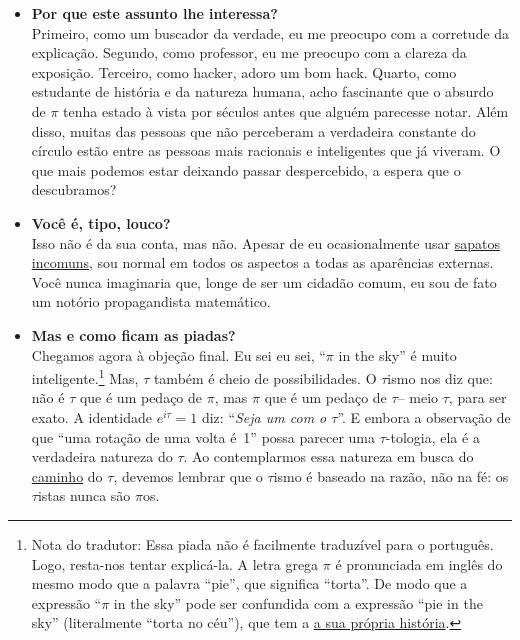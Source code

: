 \begin{itemize}
  \item \textbf{Por que este assunto lhe interessa?} \\ Primeiro, como um buscador da verdade, eu me preocupo com a corretude da explicação. Segundo, como professor, eu me preocupo com a clareza da exposição. Terceiro, como hacker, adoro um bom hack. Quarto, como estudante de história e da natureza humana, acho fascinante que o absurdo de $\pi$ tenha estado à vista por séculos antes que alguém parecesse notar. Além disso, muitas das pessoas que não perceberam a verdadeira constante do círculo estão entre as pessoas mais racionais e inteligentes que já viveram. O que mais podemos estar deixando passar despercebido, a espera que o descubramos?

  \item \textbf{Você é, tipo, louco?} \\ Isso não é da sua conta, mas não. Apesar de eu ocasionalmente usar \href{https://en.wikipedia.org/wiki/Vibram_FiveFingers}{sapatos incomuns}, sou normal em todos os aspectos a todas as aparências externas. Você nunca imaginaria que, longe de ser um cidadão comum, eu sou de fato um notório propagandista matemático.

  \item \textbf{Mas e como ficam as piadas?} \\ Chegamos agora à objeção final. Eu sei eu sei, ``$\pi$ in the sky'' é muito inteligente.\footnote{Nota do tradutor: Essa piada não é facilmente traduzível para o português. Logo, resta-nos tentar explicá-la. A letra grega $\pi$ é pronunciada em inglês do mesmo modo que a palavra ``pie'', que significa ``torta''. De modo que a expressão ``$\pi$ in the sky'' pode ser confundida com a expressão ``pie in the sky'' (literalmente ``torta no céu''), que tem a \href{https://en.wiktionary.org/wiki/pie_in_the_sky}{a sua própria história}.} Mas, $\tau$ também é cheio de possibilidades. O $\tau$ismo nos diz que: não é $\tau$ que é um pedaço de $\pi$, mas $\pi$ que é um pedaço de $\tau$-- meio $\tau$, para ser exato. A identidade $e^{i\tau} = 1$ diz: ``\emph{Seja um com o $\tau$}''. E embora a observação de que ``uma rotação de uma volta é~1'' possa parecer uma $\tau$-tologia, ela é a verdadeira natureza do $\tau$. Ao contemplarmos essa natureza em busca do \href{https://pt.wikipedia.org/wiki/Tao}{caminho} do $\tau$, devemos lembrar que o $\tau$ismo é baseado na razão, não na fé: os $\tau$istas nunca são $\pi$os.

\end{itemize}

